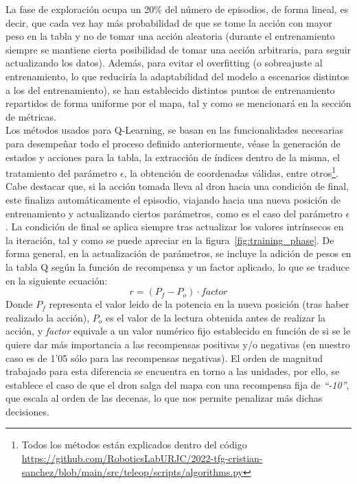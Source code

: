 La fase de exploración ocupa un 20\% del número de episodios, de forma lineal, es decir, que cada vez hay más probabilidad de que se tome la acción con mayor peso en la tabla y no de tomar una acción aleatoria (durante el entrenamiento siempre se mantiene cierta posibilidad de tomar una acción arbitraria, para seguir actualizando los datos). Además, para evitar el overfitting (o sobreajuste al entrenamiento, lo que reduciría la adaptabilidad del modelo a escenarios distintos a los del entrenamiento), se han establecido distintos puntos de entrenamiento repartidos de forma uniforme por el mapa, tal y como se mencionará en la sección de métricas.\\

Los métodos usados para Q-Learning, se basan en las funcionalidades necesarias para desempeñar todo el proceso definido anteriormente, véase la generación de estados y acciones para la tabla, la extracción de índices dentro de la misma, el tratamiento del parámetro $\epsilon$, la obtención de coordenadas válidas, entre otros\footnote[3]{Todos los métodos están explicados dentro del código \url{https://github.com/RoboticsLabURJC/2022-tfg-cristian-sanchez/blob/main/src/teleop/scripts/algorithms.py}}.\\

Cabe destacar que, si la acción tomada lleva al dron hacia una condición de final, este finaliza automáticamente el episodio, viajando hacia una nueva posición de entrenamiento y actualizando ciertos parámetros, como es el caso  del parámetro $\epsilon$. La condición de final se aplica siempre tras actualizar los valores intrínsecos en la iteración, tal y como se puede apreciar en la figura~\ref{fig:training_phase}. De forma general, en la actualización de parámetros, se incluye la adición de pesos en la tabla Q según la función de recompensa y un factor aplicado, lo que se traduce en la siguiente ecuación:
\begin{equation}
    r = (P_f - P_o) \cdot factor
\end{equation}
Donde $P_f$ representa el valor leido de la potencia en la nueva posición (tras haber realizado la acción), $P_o$ es el valor de la lectura obtenida antes de realizar la acción, y \emph{factor} equivale a un valor numérico fijo establecido en función de si se le quiere dar más importancia a las recompensas positivas y/o negativas (en nuestro caso es de 1'05 sólo para las recompensas negativas). El orden de magnitud trabajado para esta diferencia se encuentra en torno a las unidades, por ello, se establece el caso de que el dron salga del mapa con una recompensa fija de \emph{``-10''}, que escala al orden de las decenas, lo que nos permite penalizar más dichas decisiones.\\

